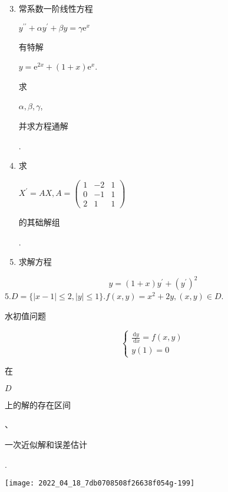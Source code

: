 \documentclass[10pt]{article}
\begin{document}
\begin{enumerate}
  \setcounter{enumi}{2}
  \item \begin{CJK}{UTF8}{mj}常系数一阶线性方程\end{CJK} $y^{\prime \prime}+\alpha y^{\prime}+\beta y=\gamma \mathrm{e}^{x}$ \begin{CJK}{UTF8}{mj}有特解\end{CJK} $y=\mathrm{e}^{2 x}+(1+x) \mathrm{e}^{x}$. \begin{CJK}{UTF8}{mj}求\end{CJK} $\alpha, \beta, \gamma$, \begin{CJK}{UTF8}{mj}并求方程通解\end{CJK}.

  \item \begin{CJK}{UTF8}{mj}求\end{CJK} $X^{\prime}=A X, A=\left(\begin{array}{ccc}1 & -2 & 1 \\ 0 & -1 & 1 \\ 2 & 1 & 1\end{array}\right)$ \begin{CJK}{UTF8}{mj}的其础解组\end{CJK}.

  \item \begin{CJK}{UTF8}{mj}求解方程\end{CJK}

\end{enumerate}
$$
y=(1+x) y^{\prime}+\left(y^{\prime}\right)^{2}
$$
$5 . D=\{|x-1| \leq 2,|y| \leq 1\} . f(x, y)=x^{2}+2 y,(x, y) \in D$.\begin{CJK}{UTF8}{mj}水初值问题\end{CJK}
$$
\left\{\begin{array}{l}
\frac{\mathrm{d} y}{\mathrm{~d} x}=f(x, y) \\
y(1)=0
\end{array}\right.
$$
\begin{CJK}{UTF8}{mj}在\end{CJK} $D$ \begin{CJK}{UTF8}{mj}上的解的存在区间\end{CJK}、\begin{CJK}{UTF8}{mj}一次近似解和误差估计\end{CJK}.

\texttt{[image: 2022\_04\_18\_7db0708508f26638f054g-199]}
\end{document}

